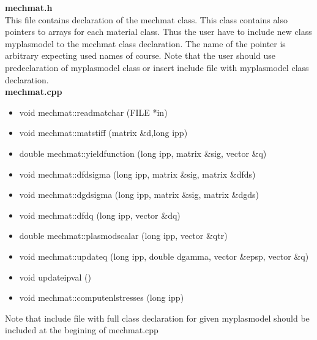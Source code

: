 {\bf mechmat.h}\\
This file contains declaration of the {\sf mechmat} class. This class contains also pointers to arrays for each
material class. Thus the user have to include new class {\sf myplasmodel} to the {\sf mechmat} class declaration.
The name of the pointer is arbitrary expecting used names of course. Note that the user should use predeclaration
of {\sf myplasmodel} class or insert include file with {\sf myplasmodel} class declaration.\\


{\bf mechmat.cpp}\\
\begin{itemize}
\item {\sf void mechmat::readmatchar (FILE *in)}
\item {\sf void mechmat::matstiff (matrix \&d,long ipp)}
\item {\sf double mechmat::yieldfunction (long ipp, matrix \&sig, vector \&q)}
\item {\sf void mechmat::dfdsigma (long ipp, matrix \&sig, matrix \&dfds)}
\item {\sf void mechmat::dgdsigma (long ipp, matrix \&sig, matrix \&dgds)}
\item {\sf void mechmat::dfdq (long ipp, vector \&dq)}
\item {\sf double mechmat::plasmodscalar (long ipp, vector \&qtr)}
\item {\sf void mechmat::updateq (long ipp, double dgamma, vector \&epsp, vector \&q)}
\item {\sf void updateipval ()}
\item {\sf void mechmat::computenlstresses (long ipp)}
\end{itemize}
Note that include file with full class declaration for given {\sf myplasmodel} should be included at the begining
of mechmat.cpp\\

